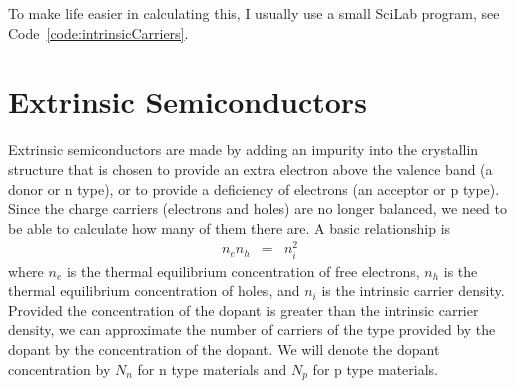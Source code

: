 To make life easier in calculating this, I usually use a small SciLab program, see Code~\ref{code:intrinsicCarriers}.


\section{Extrinsic Semiconductors}

Extrinsic semiconductors are made by adding an impurity into the crystallin structure that is chosen to provide an extra electron above the valence band (a donor or n type), or to provide a deficiency of electrons (an acceptor or p type).  Since the charge carriers (electrons and holes) are no longer balanced, we need to be able to calculate how many of them there are.  A basic relationship is
\begin{eqnarray}
n_e n_h &=& n_i^2 \label{eq:extrinsiccarrierdensity}
\end{eqnarray}
where $n_e$ is the thermal equilibrium concentration of free electrons, $n_h$ is the thermal equilibrium concentration of holes, and $n_i$ is the intrinsic carrier density.  Provided the concentration of the dopant is greater than the intrinsic carrier density, we can approximate the number of carriers of the type provided by the dopant by the concentration of the dopant.  We will denote the dopant concentration by $N_n$ for n type materials and $N_p$ for p type materials.




